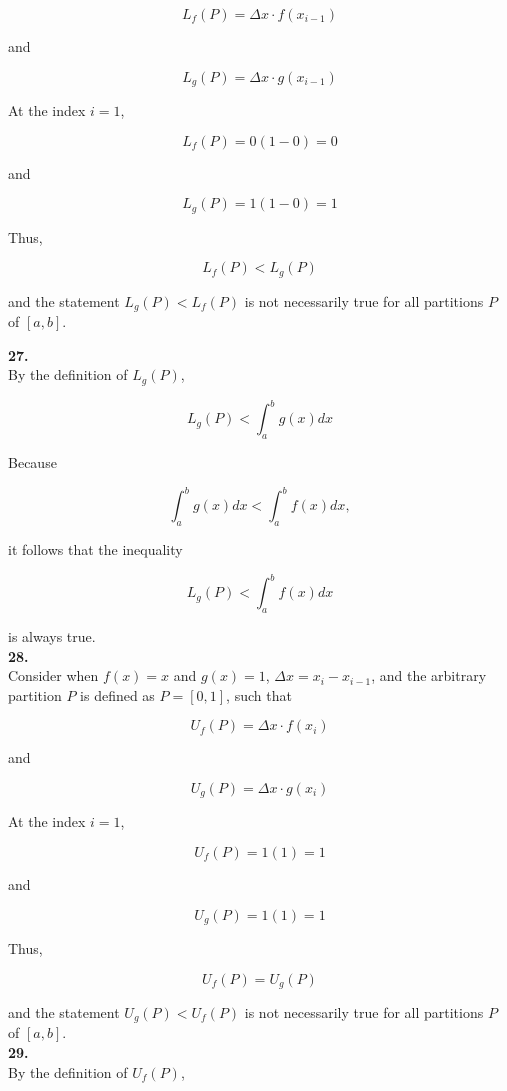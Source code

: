 \documentclass{article}
\begin{document}
    \[
        L_f (P) = \Delta x \cdot f(x_{i-1})
    \]

    and

    \[
        L_g (P) = \Delta x \cdot g(x_{i-1})
    \]

    At the index $i=1$,

    \[
        L_f (P) = 0(1-0) = 0
    \]

    and

    \[
        L_g (P) = 1(1-0) = 1
    \]

    Thus,

    \[
        L_f (P) < L_g (P)
    \]

    and the statement $L_g (P) < L_f (P)$ is not necessarily true for all partitions $P$ of $[a,b]$.

    \pagebreak
    \thispagestyle{4}

    \textbf{27.} \\
    By the definition of $L_g (P)$,

    \[
        L_g (P) < \int^b_a g(x)dx
    \]

    Because

    \[
        \int^b_a g(x)dx < \int^b_a f(x)dx,
    \]

    it follows that the inequality

    \[
        L_g (P) < \int^b_a f(x)dx
    \]

    is always true. \\

    \textbf{28.} \\
    Consider when $f(x)=x$ and $g(x)=1$, $\Delta x = x_i - x_{i-1}$, and the arbitrary partition $P$ is defined as $P=[0,1]$, such that

    \[
        U_f (P) = \Delta x \cdot f(x_i)
    \]

    and

    \[
        U_g (P) = \Delta x \cdot g(x_i)
    \]

    At the index $i=1$,

    \[
        U_f (P) = 1(1) = 1
    \]

    and

    \[
        U_g (P) = 1(1) = 1
    \]

    Thus,

    \[
        U_f (P) = U_g (P)
    \]

    and the statement $U_g (P) < U_f (P)$ is not necessarily true for all partitions $P$ of $[a,b]$. \\

    \textbf{29.} \\
    By the definition of $U_f (P)$,
\end{document}
